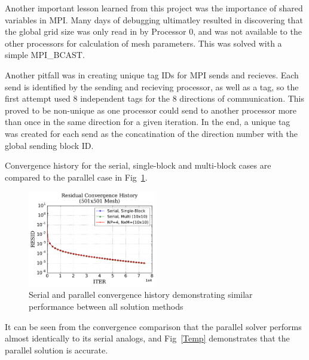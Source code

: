 \documentclass[twocolumn,10pt]{asme2ej}
\begin{document}
Another important lesson learned from this project was the importance of shared variables in MPI.  Many days of debugging ultimatley resulted in discovering that the global grid size was only read in by Processor 0, and was not available to the other processors for calculation of mesh parameters.  This was solved with a simple MPI_BCAST.

Another pitfall was in creating unique tag IDs for MPI sends and recieves.  Each send is identified by the sending and recieving processor, as well as a tag, so the first attempt used 8 independent tags for the 8 directions of communication.  This proved to be non-unique as one processor could send to another processor more than once in the same direction for a given iteration.  In the end, a unique tag was created for each send as the concatination of the direction number with the global sending block ID.

Convergence history for the serial, single-block and multi-block cases are compared to the parallel case in Fig~\ref{ResHist}.

\begin{figure}[htb]
\begin{center}
\includegraphics[width=0.5\textwidth]{../Results/ResHist.pdf}
\caption{Serial and parallel convergence history demonstrating similar performance between all solution methods}
\label{ResHist}
\end{center}
\end{figure}

It can be seen from the convergence comparison that the parallel solver performs almost identically to its serial analogs, and Fig~\ref{Temp} demonstrates that the parallel solution is accurate.
\end{document}

